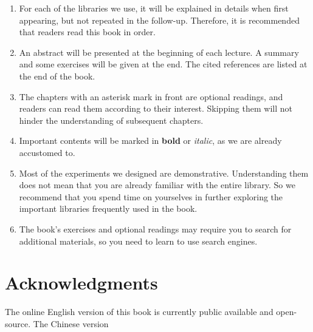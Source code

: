 \begin{enumerate}
	\item For each of the libraries we use, it will be explained in details when first appearing, but not repeated in the follow-up. Therefore, it is recommended that readers read this book in order.
	
	\item An abstract will be presented at the beginning of each lecture. A summary and some exercises will be given at the end. The cited references are listed at the end of the book.

	\item The chapters with an asterisk mark in front are optional readings, and readers can read them according to their interest. Skipping them will not hinder the understanding of subsequent chapters.
	
	\item Important contents will be marked in \textbf{bold} or \emph{italic}, as we are already accustomed to.

	\item Most of the experiments we designed are demonstrative. Understanding them does not mean that you are already familiar with the entire library. So we recommend that you spend time on yourselves in further exploring the important libraries frequently used in the book.

	\item The book's exercises and optional readings may require you to search for additional materials, so you need to learn to use search engines.
\end{enumerate}

\section{Acknowledgments}
The online English version of this book is currently public available and open-source. The Chinese version

